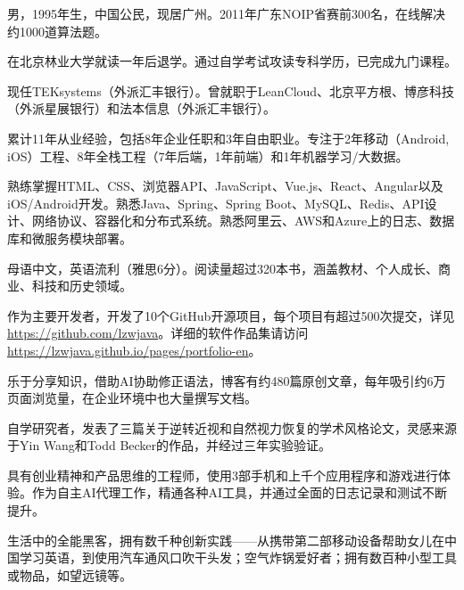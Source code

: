 

\begin{cventry}
    {} %
    {} %
    {} %
    {} %
    {
        \begin{cvitems}
            \item {男，1995年生，中国公民，现居广州。2011年广东NOIP省赛前300名，在线解决约1000道算法题。}
            \item {在北京林业大学就读一年后退学。通过自学考试攻读专科学历，已完成九门课程。}
            \item {现任TEKsystems（外派汇丰银行）。曾就职于LeanCloud、北京平方根、博彦科技（外派星展银行）和法本信息（外派汇丰银行）。}
            \item {累计11年从业经验，包括8年企业任职和3年自由职业。专注于2年移动（Android, iOS）工程、8年全栈工程（7年后端，1年前端）和1年机器学习/大数据。}
            \item {熟练掌握HTML、CSS、浏览器API、JavaScript、Vue.js、React、Angular以及iOS/Android开发。熟悉Java、Spring、Spring Boot、MySQL、Redis、API设计、网络协议、容器化和分布式系统。熟悉阿里云、AWS和Azure上的日志、数据库和微服务模块部署。}
            \item {母语中文，英语流利（雅思6分）。阅读量超过320本书，涵盖教材、个人成长、商业、科技和历史领域。}
            \item {作为主要开发者，开发了10个GitHub开源项目，每个项目有超过500次提交，详见\href{https://github.com/lzwjava}{https://github.com/lzwjava}。详细的软件作品集请访问\href{https://lzwjava.github.io/pages/portfolio-en}{https://lzwjava.github.io/pages/portfolio-en}。}
            \item {乐于分享知识，借助AI协助修正语法，博客有约480篇原创文章，每年吸引约6万页面浏览量，在企业环境中也大量撰写文档。}
            \item {自学研究者，发表了三篇关于逆转近视和自然视力恢复的学术风格论文，灵感来源于Yin Wang和Todd Becker的作品，并经过三年实验验证。}
            \item {具有创业精神和产品思维的工程师，使用3部手机和上千个应用程序和游戏进行体验。作为自主AI代理工作，精通各种AI工具，并通过全面的日志记录和测试不断提升。}
            \item {生活中的全能黑客，拥有数千种创新实践——从携带第二部移动设备帮助女儿在中国学习英语，到使用汽车通风口吹干头发；空气炸锅爱好者；拥有数百种小型工具或物品，如望远镜等。}
        \end{cvitems}                
    }
\end{cventry}